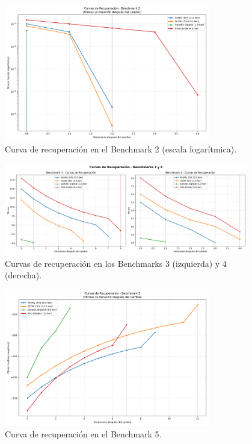\documentclass[10pt]{article}
\begin{document}
\begin{figure}[H]
    \centering
    \includegraphics[width=0.8\textwidth]{imagenes/curva2.png}
    \caption{Curva de recuperación en el Benchmark 2 (escala logarítmica).}
    \label{fig:curva2}
\end{figure}

\begin{figure}[H]
    \centering
    \includegraphics[width=0.95\textwidth]{imagenes/curva 3 y 4.png}
    \caption{Curvas de recuperación en los Benchmarks 3 (izquierda) y 4 (derecha).}
    \label{fig:curva3y4}
\end{figure}

\begin{figure}[H]
    \centering
    \includegraphics[width=0.8\textwidth]{imagenes/curva5.png}
    \caption{Curva de recuperación en el Benchmark 5.}
    \label{fig:curva5}
\end{figure}
\end{document}
